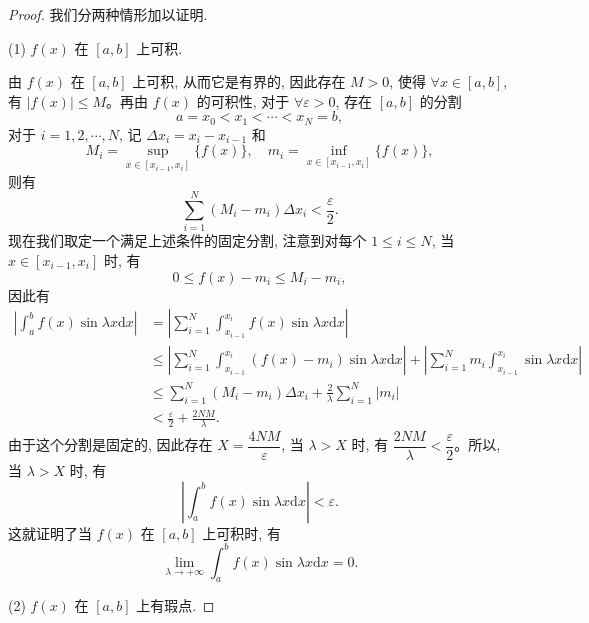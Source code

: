 \begin{proof}
我们分两种情形加以证明.

(1) $f(x)$ 在 $[a,b]$ 上可积.

由 $f(x)$ 在 $[a,b]$ 上可积, 从而它是有界的, 因此存在 $M>0$, 使得 $\forall x\in[a,b]$, 有 $|f(x)|\leqslant M$。再由 $f(x)$ 的可积性, 对于 $\forall\varepsilon>0$, 存在 $[a,b]$ 的分割
\[
  a=x_0<x_1<\cdots<x_N=b,
\]
对于 $i=1,2,\cdots,N$, 记 $\Delta x_i=x_i-x_{i-1}$ 和
\[
  M_i=\sup_{x\in[x_{i-1},x_i]}\{f(x)\},\quad
  m_i=\inf_{x\in[x_{i-1},x_i]}\{f(x)\},
\]
则有
\[
  \sum_{i=1}^N(M_i-m_i)\Delta x_i<\frac{\varepsilon}{2}.
\]
现在我们取定一个满足上述条件的固定分割, 注意到对每个 $1\leqslant i\leqslant N$, 当 $x\in[x_{i-1},x_i]$ 时, 有
\[
  0\leqslant f(x)-m_i\leqslant M_i-m_i,
\]
因此有
\[
\begin{aligned}
  \left|\int_a^b f(x)\sin\lambda x\mathrm dx\right|
  &=\left|\sum_{i=1}^N\int_{x_{i-1}}^{x_i}f(x)\sin\lambda x\mathrm dx\right|\\
  &\leqslant\left|\sum_{i=1}^N\int_{x_{i-1}}^{x_i}(f(x)-m_i)\sin\lambda x\mathrm dx\right|
    +\left|\sum_{i=1}^N m_i\int_{x_{i-1}}^{x_i}\sin\lambda x\mathrm dx\right|\\
  &\leqslant\sum_{i=1}^N(M_i-m_i)\Delta x_i+\frac2\lambda\sum_{i=1}^N|m_i|\\
  &<\frac{\varepsilon}{2}+\frac{2NM}{\lambda}.
\end{aligned}
\]
由于这个分割是固定的, 因此存在 $X=\dfrac{4NM}{\varepsilon}$, 当 $\lambda>X$ 时, 有 $\dfrac{2NM}{\lambda}<\dfrac{\varepsilon}{2}$。所以, 当 $\lambda>X$ 时, 有
\[
  \left|\int_a^b f(x)\sin\lambda x\mathrm dx\right|<\varepsilon.
\]
这就证明了当 $f(x)$ 在 $[a,b]$ 上可积时, 有
\[
  \lim_{\lambda\to+\infty}\int_a^b f(x)\sin\lambda x\mathrm dx=0.
\]

(2) $f(x)$ 在 $[a,b]$ 上有瑕点.


\end{proof}
